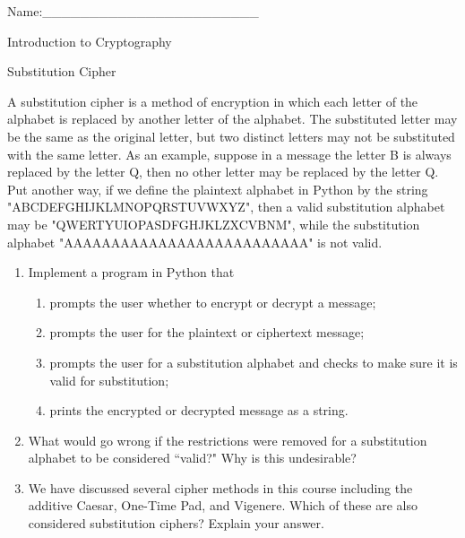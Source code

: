 \documentclass[12pt]{amsart}
\theoremstyle{definition}
\theoremstyle{remark}
\numberwithin{equation}{section}
\begin{document}
\begin{flushright}
Name:\_\_\_\_\_\_\_\_\_\_\_\_\_\_\_\_\_\_\_\_\_\_\_
\end{flushright}
\vspace{10pt}
\begin{center}
Introduction to Cryptography

Substitution Cipher
\end{center}


A substitution cipher is a method of encryption in which each letter of the alphabet is replaced by another letter of the alphabet. The substituted letter may be the same as the original letter, but two distinct letters may not be substituted with the same letter. As an example, suppose in a message the letter B is always replaced by the letter Q, then no other letter may be replaced by the letter Q. Put another way, if we define the plaintext alphabet in Python by the string "ABCDEFGHIJKLMNOPQRSTUVWXYZ", then a valid substitution alphabet may be "QWERTYUIOPASDFGHJKLZXCVBNM", while the substitution alphabet "AAAAAAAAAAAAAAAAAAAAAAAAAA" is not valid.

\begin{enumerate}
\item Implement a program in Python that 
\begin{enumerate}
\item prompts the user whether to encrypt or decrypt a message;
\item prompts the user for the plaintext or ciphertext message;
\item prompts the user for a substitution alphabet and checks to make sure it is valid for substitution;
\item prints the encrypted or decrypted message as a string.
\end{enumerate}
\item What would go wrong if the restrictions were removed for a substitution alphabet to be considered ``valid?" Why is this undesirable?
\item We have discussed several cipher methods in this course including the additive Caesar, One-Time Pad, and Vigenere. Which of these are also considered substitution ciphers? Explain your answer.
\end{enumerate}
\vfill
\end{document}
